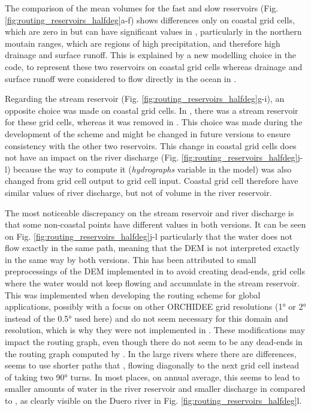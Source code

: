 The comparison of the mean volumes for the fast and slow reservoirs (Fig. \ref{fig:routing_reservoirs_halfdeg}a-f) shows differences only on coastal grid cells, which are zero in \std but can have significant values in \native, particularly in the northern moutain ranges, which are regions of high precipitation, and therefore high drainage and surface runoff. %
This is explained by a new modelling choice in the \native code, to represent these two reservoirs on coastal grid cells whereas drainage and surface runoff were considered to flow directly in the ocean in \std. %

Regarding the stream reservoir (Fig. \ref{fig:routing_reservoirs_halfdeg}g-i), an opposite choice was made on coastal grid cells. In \std, there was a stream reservoir for these grid cells, whereas it was removed in \native. This choice was made during the development of the scheme and might be changed in future versions to ensure consistency with the other two reservoirs. 
This change in coastal grid cells does not have an impact on the river discharge (Fig. \ref{fig:routing_reservoirs_halfdeg}j-l) because the way to compute it (\textit{hydrographs} variable in the model) was also changed from grid cell output to grid cell input. Coastal grid cell therefore have similar values of river discharge, but not of volume in the river reservoir. 

The most noticeable discrepancy on the stream reservoir and river discharge is that some non-coastal points have different values in both versions. It can be seen on Fig. \ref{fig:routing_reservoirs_halfdeg}j-l particularly that the water does not flow exactly in the same path, meaning that the DEM is not interpreted exactly in the same way by both versions. This has been attributed to small preprocessings of the DEM implemented in \std to avoid creating dead-ends, grid cells where the water would not keep flowing and accumulate in the stream reservoir. This was implemented when developing the routing scheme for global applications, possibly with a focus on other ORCHIDEE grid resolutions (1° or 2° instead of the 0.5° used here) and do not seem necessary for this domain and resolution, which is why they were not implemented in \native. These modifications may impact the routing graph, even though there do not seem to be any dead-ends in the routing graph computed by \native. In the large rivers where there are differences, \native seems to use shorter paths that \std, flowing diagonally to the next grid cell instead of taking two 90° turns. In most places, on annual average, this seems to lead to smaller amounts of water in the river reservoir and smaller discharge in \native compared to \std, as clearly visible on the Duero river in Fig. \ref{fig:routing_reservoirs_halfdeg}l.

